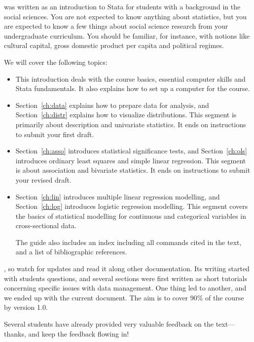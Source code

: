 %
	 was written as an introduction to Stata for students with a background in the social sciences. You are not expected to know anything about statistics, but you are expected to know a few things about social science research from your undergraduate curriculum. You should be familiar, for instance, with notions like cultural capital, gross domestic product per capita and political regimes.%

	We will cover the following topics:%

	\begin{itemize}
		\item This introduction deals with the course basics, essential computer skills and Stata fundamentals. It also explains how to set up a computer for the course.%
	
		\item %
		Section~\ref{ch:data} explains how to prepare data for analysis, and %
		Section~\ref{ch:distr} explains how to visualize distributions. This segment is primarily about description and univariate statistics. %
    It ends on instructions to submit your first draft.
	
		\item %
		Section~\ref{ch:asso} introduces statistical significance tests, and %
		Section~\ref{ch:ols} introduces ordinary least squares and simple linear regression. This segment is about association and bivariate statistics. %
    It ends on instructions to submit your revised draft.

		\item %
		Section~\ref{ch:lin} introduces multiple linear regression modelling, and %
		Section~\ref{ch:log} introduces logistic regression modelling. This segment covers the basics of statistical modelling for continuous and categorical variables in cross-sectional data. %

    The guide also includes an index including all commands cited in the text, and a list of bibliographic references.%
	\end{itemize}

, so watch for updates and read it along other documentation. Its writing started with students questions, and several sections were first written as short tutorials concerning specific issues with data management. One thing led to another, and we ended up with the current document. The aim is to cover 90\% of the course by version 1.0.%

	Several students have already provided very valuable feedback on the text—thanks, and keep the feedback flowing in!%


